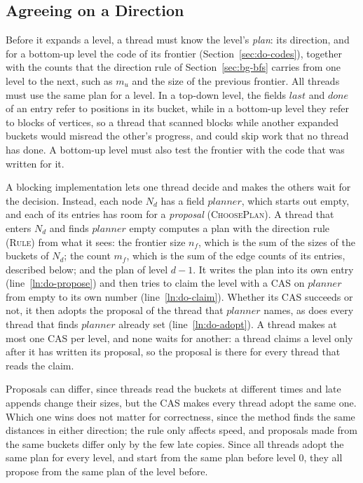 \subsection{Agreeing on a Direction}
\label{sec:do-plan}

Before it expands a level, a thread must know the level's \emph{plan}: its direction, and for a bottom-up level the code of its frontier (Section~\ref{sec:do-codes}), together with the counts that the direction rule of Section~\ref{sec:bg-bfs} carries from one level to the next, such as $m_u$ and the size of the previous frontier. All threads must use the same plan for a level. In a top-down level, the fields $\mathit{last}$ and $\mathit{done}$ of an entry refer to positions in its bucket, while in a bottom-up level they refer to blocks of vertices, so a thread that scanned blocks while another expanded buckets would misread the other's progress, and could skip work that no thread has done. A bottom-up level must also test the frontier with the code that was written for it.

A blocking implementation lets one thread decide and makes the others wait for the decision. Instead, each node $N_d$ has a field $\mathit{planner}$, which starts out empty, and each of its entries has room for a \emph{proposal} (\textsc{ChoosePlan}). A thread that enters $N_d$ and finds $\mathit{planner}$ empty computes a plan with the direction rule (\textsc{Rule}) from what it sees: the frontier size $n_f$, which is the sum of the sizes of the buckets of $N_d$; the count $m_f$, which is the sum of the edge counts of its entries, described below; and the plan of level $d-1$. It writes the plan into its own entry (line~\ref{ln:do-propose}) and then tries to claim the level with a CAS on $\mathit{planner}$ from empty to its own number (line~\ref{ln:do-claim}). Whether its CAS succeeds or not, it then adopts the proposal of the thread that $\mathit{planner}$ names, as does every thread that finds $\mathit{planner}$ already set (line~\ref{ln:do-adopt}). A thread makes at most one CAS per level, and none waits for another: a thread claims a level only after it has written its proposal, so the proposal is there for every thread that reads the claim.

Proposals can differ, since threads read the buckets at different times and late appends change their sizes, but the CAS makes every thread adopt the same one. Which one wins does not matter for correctness, since the method finds the same distances in either direction; the rule only affects speed, and proposals made from the same buckets differ only by the few late copies. Since all threads adopt the same plan for every level, and start from the same plan before level 0, they all propose from the same plan of the level before.

